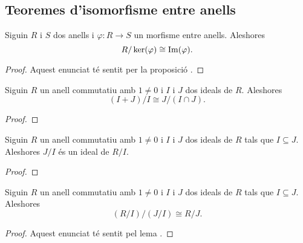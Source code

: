 \documentclass[../../Main.tex]{subfiles}
\begin{document}
	\subsection{Teoremes d'isomorfisme entre anells} %
	\begin{theorem}
		\label{thm:Primer Teorema de l'isomorfisme entre anells}
		Siguin \(R\) i \(S\) dos anells i \(\varphi\colon R\longrightarrow S\) un morfisme entre anells. Aleshores
		\[R/\operatorname{ker}(\varphi)\cong\operatorname{Im}(\varphi).\]
		\begin{proof}
			Aquest enunciat té sentit per la proposició . %
		\end{proof}
	\end{theorem}
	\begin{theorem}
		\label{thm:Segon Teorema de l'isomorfisme entre anells}
		Siguin \(R\) un anell commutatiu amb \(1\neq0\) i \(I\) i \(J\) dos ideals de \(R\). Aleshores
		\[(I+J)/I\cong J/(I\cap J).\]
		\begin{proof}
		\end{proof}
	\end{theorem}
	\begin{lemma}
		\label{lema:Tercer Teorema de l'isomorfisme entre anells}
		Siguin \(R\) un anell commutatiu amb \(1\neq0\) i \(I\) i \(J\) dos ideals de \(R\) tals que \(I\subseteq J\). Aleshores \(J/I\) és un ideal de \(R/I\). %
		\begin{proof}
		\end{proof}
	\end{lemma}
	\begin{theorem}
		\label{thm:Tercer Teorema de l'isomorfisme entre anells}
		Siguin \(R\) un anell commutatiu amb \(1\neq0\) i \(I\) i \(J\) dos ideals de \(R\) tals que \(I\subseteq J\). Aleshores
		\[(R/I)/(J/I)\cong R/J.\]
		\begin{proof}
			Aquest enunciat té sentit pel lema . %
		\end{proof}
	\end{theorem}
\end{document}
